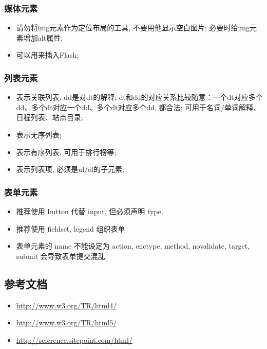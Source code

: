 \documentclass[letterpaper,10pt,english]{sphinxmanual}
\begin{document}
\subsubsection{媒体元素}
\label{styleguide/html-coding-style:id9}\begin{itemize}
\item {}
 请勿将img元素作为定位布局的工具, 不要用他显示空白图片; 必要时给img元素增加alt属性;

\item {}
 可以用来插入Flash;

\end{itemize}


\subsubsection{列表元素}
\label{styleguide/html-coding-style:id10}\begin{itemize}
\item {}
 表示关联列表, dd是对dt的解释; dt和dd的对应关系比较随意：一个dt对应多个dd、多个dt对应一个dd、多个dt对应多个dd, 都合法; 可用于名词/单词解释、日程列表、站点目录;

\item {}
 表示无序列表;

\item {}
 表示有序列表, 可用于排行榜等;

\item {}
 表示列表项, 必须是ul/ol的子元素;

\end{itemize}


\subsubsection{表单元素}
\label{styleguide/html-coding-style:id11}\begin{itemize}
\item {}
推荐使用 button 代替 input, 但必须声明 type;

\item {}
推荐使用 fieldset, legend 组织表单

\item {}
表单元素的 name 不能设定为 action, enctype, method, novalidate, target, submit 会导致表单提交混乱

\end{itemize}


\subsection{参考文档}
\label{styleguide/html-coding-style:id12}\begin{itemize}
\item {}
\href{http://www.w3.org/TR/html4/}{http://www.w3.org/TR/html4/}

\item {}
\href{http://www.w3.org/TR/html5/}{http://www.w3.org/TR/html5/}

\item {}
\href{http://reference.sitepoint.com/html/}{http://reference.sitepoint.com/html/}

\end{itemize}
\end{document}
